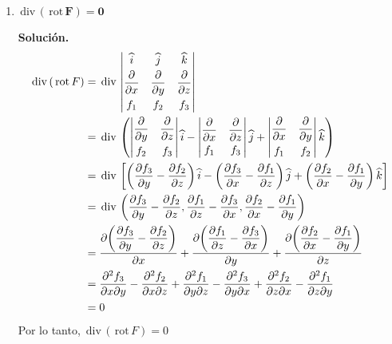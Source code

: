 \documentclass[fleqn, 12pt]{article}
\newcommand{\derivadaparcial}[2]{\dfrac{\partial {#1}}{\partial {#2}}}
\newcommand{\derivadaparcialnd}[3]{\dfrac{\partial^{2} {#1}}{\partial {#3} \partial {#2}}}
\newcommand{\rot}{\mathrm{\, rot \,}}
\newcommand{\dive}{\mathrm{\, div \,}}
\begin{document}
\begin{enumerate}
        \item $ \mathbf{\dive (\rot F) = 0} $
        
        \textbf{Solución.}
        \begin{align*}
            \dive (\rot F) &= \dive \left\lvert 
            \begin{matrix}
                \widehat{i} & \widehat{j} & \widehat{k} \vspace{1mm} \\
                \derivadaparcial{}{x} & \derivadaparcial{}{y} & \derivadaparcial{}{z} \vspace{1mm} \\
                f_1 & f_2 & f_3
            \end{matrix} \right\rvert \\
            &= \dive \left( \left\rvert 
            \begin{matrix}
                \derivadaparcial{}{y} & \derivadaparcial{}{z} \vspace{1mm} \\
                f_2 & f_3
            \end{matrix}
            \right\rvert \widehat{i} -
            \left\rvert 
            \begin{matrix}
                \derivadaparcial{}{x} & \derivadaparcial{}{z} \vspace{1mm} \\
                f_1 & f_3
            \end{matrix}
            \right\rvert \widehat{j} +
            \left\rvert 
            \begin{matrix}
                \derivadaparcial{}{x} & \derivadaparcial{}{y} \vspace{1mm} \\
                f_1 & f_2
            \end{matrix}
            \right\rvert \widehat{k} \right) \\
            &= \dive \left[ \left( \derivadaparcial{f_3}{y} - \derivadaparcial{f_2}{z} \right) \widehat{i} - \left( \derivadaparcial{f_3}{x} - \derivadaparcial{f_1}{z} \right) \widehat{j} + \left( \derivadaparcial{f_2}{x} - \derivadaparcial{f_1}{y} \right) \widehat{k} \right] \\
            &= \dive \left( \derivadaparcial{f_3}{y} - \derivadaparcial{f_2}{z}, \derivadaparcial{f_1}{z} - \derivadaparcial{f_3}{x}, \derivadaparcial{f_2}{x} - \derivadaparcial{f_1}{y} \right) \\
            &= \derivadaparcial{\left( \derivadaparcial{f_3}{y} - \derivadaparcial{f_2}{z} \right)}{x} + \derivadaparcial{\left( \derivadaparcial{f_1}{z} - \derivadaparcial{f_3}{x} \right)}{y} + \derivadaparcial{\left( \derivadaparcial{f_2}{x} - \derivadaparcial{f_1}{y} \right)}{z} \\
            &= \derivadaparcialnd{f_3}{y}{x} - \derivadaparcialnd{f_2}{z}{x} + \derivadaparcialnd{f_1}{z}{y} - \derivadaparcialnd{f_3}{x}{y} + \derivadaparcialnd{f_2}{x}{z} - \derivadaparcialnd{f_1}{y}{z} \\
            &= 0
        \end{align*}
        Por lo tanto, $ \dive (\rot F) = 0 $


\end{enumerate}
\end{document}
